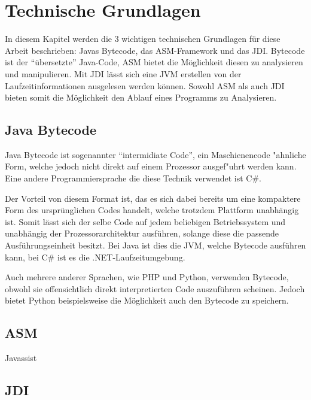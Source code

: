 
\chapter{Technische Grundlagen}

In diesem Kapitel werden die 3 wichtigen technischen Grundlagen für diese Arbeit beschrieben: Javas Bytecode, das ASM-Framework und das \ac{JDI}. Bytecode ist der "`übersetzte"' Java-Code, ASM bietet die Möglichkeit diesen zu analysieren und manipulieren. Mit \ac{JDI} lässt sich eine \ac{JVM} erstellen von der Laufzeitinformationen ausgelesen werden können. Sowohl ASM als auch \ac{JDI} bieten somit die Möglichkeit den Ablauf eines Programms zu Analysieren.

\section{Java Bytecode} 

Java Bytecode ist sogenannter "`intermidiate Code"', ein Maschienencode "ahnliche Form, welche jedoch nicht direkt auf einem Prozessor ausgef"uhrt werden kann. Eine andere Programmiersprache die diese Technik verwendet ist C\#.

Der Vorteil von diesem Format ist, das es sich dabei bereits um eine kompaktere Form des ursprünglichen Codes handelt, welche trotzdem Plattform unabhängig ist. Somit lässt sich der selbe Code auf jedem beliebigen Betriebssystem und unabhängig der Prozessorarchitektur ausführen, solange diese die passende Ausführungseinheit besitzt.
Bei Java ist dies die \ac{JVM}, welche Bytecode ausführen kann, bei C\# ist es die .NET-Laufzeitumgebung.

Auch mehrere anderer Sprachen, wie PHP und Python, verwenden Bytecode, obwohl sie offensichtlich direkt interpretierten Code auszuführen scheinen. Jedoch bietet Python beispielsweise die Möglichkeit auch den Bytecode zu speichern.

\section{ASM} 

Javassist

\section{JDI} 

